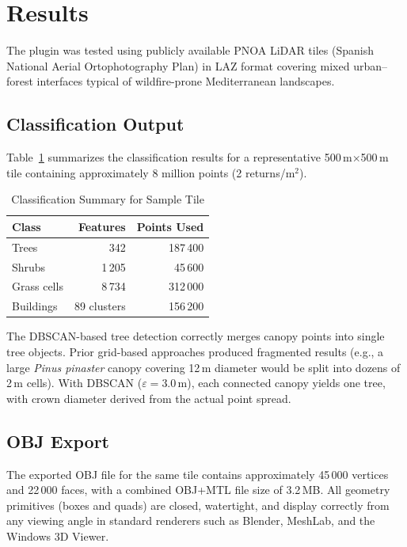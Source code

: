 \section{Results}
\label{sec:results}

The plugin was tested using publicly available PNOA LiDAR tiles (Spanish National Aerial Ortophotography Plan) in LAZ format covering mixed urban--forest interfaces typical of wildfire-prone Mediterranean landscapes.

\subsection{Classification Output}

Table~\ref{tab:classification} summarizes the classification results for a representative 500\,m$\times$500\,m tile containing approximately 8 million points (2 returns/m$^2$).

\begin{table}[h]
\centering
\caption{Classification Summary for Sample Tile}
\label{tab:classification}
\begin{tabular}{lrr}
\hline
\textbf{Class} & \textbf{Features} & \textbf{Points Used} \\
\hline
Trees       & 342 & 187\,400 \\
Shrubs      & 1\,205 & 45\,600 \\
Grass cells & 8\,734 & 312\,000 \\
Buildings   & 89 clusters & 156\,200 \\
\hline
\end{tabular}
\end{table}

The DBSCAN-based tree detection correctly merges canopy points into single tree objects. Prior grid-based approaches produced fragmented results (e.g., a large \textit{Pinus pinaster} canopy covering 12\,m diameter would be split into dozens of 2\,m cells). With DBSCAN ($\varepsilon=3.0$\,m), each connected canopy yields one tree, with crown diameter derived from the actual point spread.

\subsection{OBJ Export}

The exported OBJ file for the same tile contains approximately 45\,000 vertices and 22\,000 faces, with a combined OBJ+MTL file size of 3.2\,MB. All geometry primitives (boxes and quads) are closed, watertight, and display correctly from any viewing angle in standard renderers such as Blender, MeshLab, and the Windows 3D Viewer.

